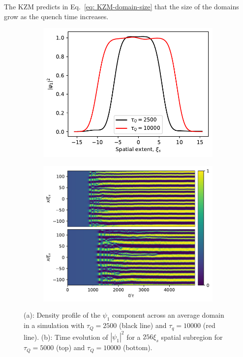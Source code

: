 The KZM predicts in Eq.~\eqref{eq: KZM-domain-size} that the size of the domains
grow as the quench time increases.
\begin{figure}[tb]
    \centering
    \begin{subfigure}{0.45\textwidth}
        \includegraphics[width=\textwidth]{gfx/ch-spin1/BA-FM_domain_width.pdf}
        \caption{}
        \label{fig: BA-FM-domain-width-comparison}
    \end{subfigure}
    \begin{subfigure}{0.45\textwidth}
        \includegraphics[width=\textwidth]{gfx/ch-spin1/BA-FM_domain_onset.pdf}
        \caption{}
        \label{fig: BA-FM-domain-onset}
    \end{subfigure}
    \caption{(a): Density profile of the $\psi_1$ component across an average
    domain in a simulation with $\tau_Q=2500$ (black line) and
    $\tau_q=10000$ (red line).
    (b): Time evolution of $|\psi_1|^2$ for a $256\xi_s$ spatial subregion
    for $\tau_Q=5000$ (top) and $\tau_Q=10000$ (bottom).}
\end{figure}
